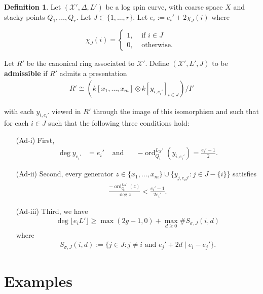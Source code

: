 \documentclass{amsart}
\theoremstyle{plain}
\theoremstyle{definition}
\newtheorem{defn}[thm]{Definition}
\theoremstyle{remark}
\numberwithin{equation}{section}
\newcommand \sx{\mathscr X}
\DeclareMathOperator{\ord}{ord}
\newcommand \subhalf[1]{\frac{{#1} - 1}{2{#1}}}
\newcommand{\halfcan}{L}
\begin{document}
\begin{defn}
\label{defn:admissible}
Let $(\sx', \Delta, L')$ be a log spin
curve, with coarse space $X$ and stacky points $Q_1, \ldots, Q_r$.  Let $J \subset
\{1, \ldots, r\}$. Let $e_i := e_i'+ 2 \chi_J (i)$ where

\[
\chi_J(i) = \begin{cases}
	1, &\text{ if }i \in J\\
	0, &\text{ otherwise. } 
\end{cases}
\]

Let $R'$ be the canonical ring associated to $\sx'$. Define $(\sx',L',J)$
to be {\bf admissible} if $R'$ admits a presentation
\begin{align*}
	R' \cong \left( k[x_1, \ldots, x_m] \otimes k[y_{i, e_i'}]_{i \in J} \right)/I'
\end{align*}

\noindent
with each $y_{i, e_i'}$ viewed in $R'$ through the image of this isomorphism and such that for each $i \in J$ such that the following
three conditions hold:
\begin{enumerate}
	\item[(Ad-i)] First, 
	\begin{align*}
	\deg y_{e_i'} &= e_i'  &\text{ and } &&-\ord_{Q_i}^{\halfcan_X'}(y_{i, e_i'})
		= \frac{e_i'- 1}{2}.
	\end{align*}
		\item[(Ad-ii)] Second, every generator $z \in \{x_1, \ldots, x_m\} \cup \{y_{j,e_ij'}: j\in J - \{i\} \}$ satisfies
		\begin{align*}
			\frac{-\ord_{Q_i}
^{\halfcan_X'}(z)}{\deg z} < \subhalf {e_i'}.
		\end{align*}
	\item[(Ad-iii)] Third, we have
		\begin{align*}
			\deg \lfloor e_i L' \rfloor \geq \max(2g - 1,0) + \max_{d \geq 0} \# S_{\sigma, J}(i, d)
		\end{align*}
		where
		\begin{align*}
			S_{\sigma, J}(i, d) := \{j \in J : j \neq i \text{ and } e_j'+2d
			\mid e_i - e_j'\}.
		\end{align*}
\end{enumerate}
\end{defn}


\section{Examples}
\label{sec:examples}
\end{document}
